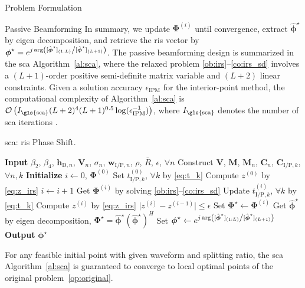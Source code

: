 \begin{section}{Problem Formulation}
\begin{subsection}{Passive Beamforming}
		In summary, we update $\boldsymbol{\Phi}^{(i)}$ until convergence, extract $\hat{\boldsymbol{\phi}}^\star$ by eigen decomposition, and retrieve the	\gls{ris} vector by $\boldsymbol{\phi}^{\star}=e^{j \arg\left([\hat{\boldsymbol{\phi}}^\star]_{(1:L)} \middle/ [\hat{\boldsymbol{\phi}}^\star]_{(L+1)}\right)}$. The passive beamforming design is summarized in the \gls{sca} Algorithm~\ref{al:sca}, where the relaxed problem \eqref{ob:irs}--\eqref{co:irs_sd} involves a $(L+1)$-order positive semi-definite matrix variable and $(L+2)$ linear constraints. Given a solution accuracy $\epsilon_{\mathrm{IPM}}$ for the interior-point method, the computational complexity of Algorithm~\ref{al:sca} is $\mathcal{O}\left(I_{\mathrm{\gls{sca}}}(L+2)^4 (L+1)^{0.5} \log(\epsilon_{\mathrm{IPM}}^{-1})\right)$, where $I_{\mathrm{\gls{sca}}}$ denotes the number of \gls{sca} iterations \cite{Luo2010b}.

		\begin{algorithm}[!t]
			\caption{\gls{sca}: \gls{ris} Phase Shift.}
			\label{al:sca}
			\begin{algorithmic}[1]
				\State \textbf{Input} $\beta_2$, $\beta_4$, $\boldsymbol{h}_{\mathrm{D},n}$, $\boldsymbol{V}_{n}$, $\sigma_n$, $\boldsymbol{w}_{\mathrm{I/P},n}$, $\rho$, $\bar{R}$, $\epsilon$, $\forall n$
				\State Construct $\boldsymbol{V}$, $\boldsymbol{M}$, $\boldsymbol{M}_n$, $\boldsymbol{C}_{n}$, $\boldsymbol{C}_{\mathrm{I/P},k}$, $\forall n,k$
				\State \textbf{Initialize} $i \gets 0$, $\boldsymbol{\Phi}^{(0)}$
				\State Set $t_{\mathrm{I/P},k}^{(0)}$, $\forall k$ by \eqref{eq:t_k}
				\State Compute $z^{(0)}$ by \eqref{eq:z_irs}
				\Repeat
					\State $i \gets i + 1$
					\State Get $\boldsymbol{\Phi}^{(i)}$ by solving \eqref{ob:irs}--\eqref{co:irs_sd}
					\State Update $t_{\mathrm{I/P},k}^{(i)}$, $\forall k$ by \eqref{eq:t_k}
					\State Compute $z^{(i)}$ by \eqref{eq:z_irs}
				\Until $\lvert z^{(i)}-z^{(i-1)} \rvert \le \epsilon$
				\State Set $\boldsymbol{\Phi}^{\star} \gets \boldsymbol{\Phi}^{(i)}$
				\State Get $\hat{\boldsymbol{\phi}}^\star$ by eigen decomposition, $\boldsymbol{\Phi}^{\star}=\hat{\boldsymbol{\phi}}^\star(\hat{\boldsymbol{\phi}}^\star)^H$
				\State Set $\boldsymbol{\phi}^{\star} \gets e^{j \arg\left([\hat{\boldsymbol{\phi}}^\star]_{(1:L)} \middle/ [\hat{\boldsymbol{\phi}}^\star]_{(L+1)}\right)}$
				\State \textbf{Output} $\boldsymbol{\phi}^{\star}$
			\end{algorithmic}
		\end{algorithm}

		\begin{proposition}\label{pr:sca}
			For any feasible initial point with given waveform and splitting ratio, the \gls{sca} Algorithm~\ref{al:sca} is guaranteed to converge to local optimal points of the original problem~\eqref{op:original}.
		\end{proposition}


\end{subsection}
\end{section}

